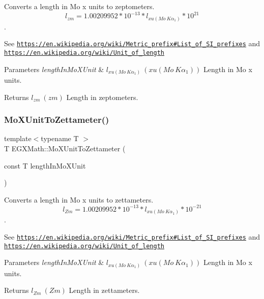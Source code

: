 Converts a length in Mo x units to zeptometers. \[ l_{zm}=1.00209952*10^{-13} * l_{xu(Mo\ K\alpha_1)} * 10^{21} \]. 

See \href{https://en.wikipedia.org/wiki/Metric_prefix#List_of_SI_prefixes}{\tt https\+://en.\+wikipedia.\+org/wiki/\+Metric\+\_\+prefix\#\+List\+\_\+of\+\_\+\+S\+I\+\_\+prefixes} and \href{https://en.wikipedia.org/wiki/Unit_of_length}{\tt https\+://en.\+wikipedia.\+org/wiki/\+Unit\+\_\+of\+\_\+length} 
\begin{DoxyParams}{Parameters}
{\em length\+In\+Mo\+X\+Unit} & $ l_{xu(Mo\ K\alpha_1)}\ (xu(Mo\ K\alpha_1))$ Length in Mo x units. \\
\hline
\end{DoxyParams}
\begin{DoxyReturn}{Returns}
$ l_{zm}\ (zm)$ Length in zeptometers. 
\end{DoxyReturn}
\mbox{\label{group___e_g_x_math-_conversions-_length_conversions-_non-_s_i-_mo_x_unit-_s_i_ga42140ef81550c27028b758c9f15200e3}} 
\subsubsection{\texorpdfstring{Mo\+X\+Unit\+To\+Zettameter()}{MoXUnitToZettameter()}}
{\footnotesize\ttfamily template$<$typename T $>$ \\
T E\+G\+X\+Math\+::\+Mo\+X\+Unit\+To\+Zettameter (\begin{DoxyParamCaption}\item[{const T}]{length\+In\+Mo\+X\+Unit }\end{DoxyParamCaption})}



Converts a length in Mo x units to zettameters. \[ l_{Zm}=1.00209952*10^{-13} * l_{xu(Mo\ K\alpha_1)} * 10^{-21} \]. 

See \href{https://en.wikipedia.org/wiki/Metric_prefix#List_of_SI_prefixes}{\tt https\+://en.\+wikipedia.\+org/wiki/\+Metric\+\_\+prefix\#\+List\+\_\+of\+\_\+\+S\+I\+\_\+prefixes} and \href{https://en.wikipedia.org/wiki/Unit_of_length}{\tt https\+://en.\+wikipedia.\+org/wiki/\+Unit\+\_\+of\+\_\+length} 
\begin{DoxyParams}{Parameters}
{\em length\+In\+Mo\+X\+Unit} & $ l_{xu(Mo\ K\alpha_1)}\ (xu(Mo\ K\alpha_1))$ Length in Mo x units. \\
\hline
\end{DoxyParams}
\begin{DoxyReturn}{Returns}
$ l_{Zm}\ (Zm)$ Length in zettameters. 
\end{DoxyReturn}

